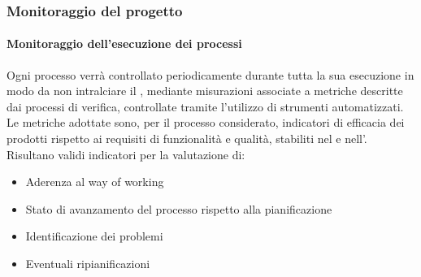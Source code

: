 
			\subsubsection{Monitoraggio del progetto}

			\paragraph{Monitoraggio dell'esecuzione dei processi}
			Ogni processo verrà controllato periodicamente durante tutta la sua esecuzione in modo da non intralciare il ,
			mediante misurazioni associate a metriche descritte dai processi di verifica, controllate tramite l'utilizzo di strumenti automatizzati.
			Le metriche adottate sono, per il processo considerato, indicatori di efficacia dei prodotti rispetto ai requisiti di funzionalità e qualità,
			stabiliti nel \Doc{\PdQv} e nell'\Doc{\AdRv}.\\
			Risultano validi indicatori per la valutazione di:
			\begin{itemize}
				\item Aderenza al way of working
				\item Stato di avanzamento del processo rispetto alla pianificazione
				\item Identificazione dei problemi
				\item Eventuali ripianificazioni
			\end{itemize}

